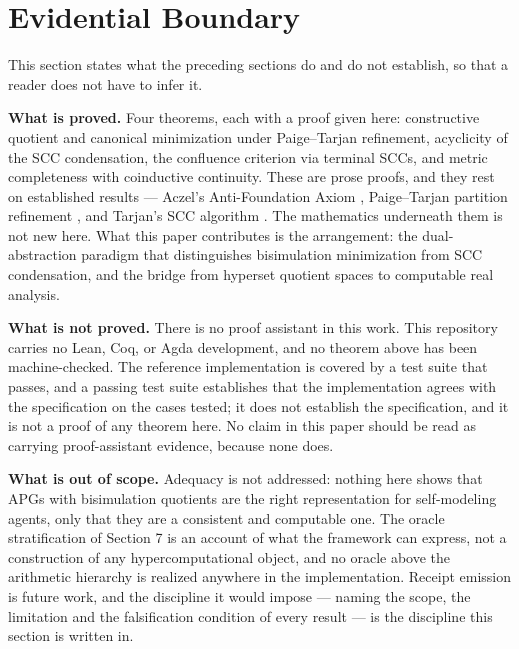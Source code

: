 \documentclass[11pt]{article}
\theoremstyle{definition}
\begin{document}
\section{Evidential Boundary}
This section states what the preceding sections do and do not establish, so that a reader does not have to infer it.

\noindent\textbf{What is proved.} Four theorems, each with a proof given here: constructive quotient and canonical minimization under Paige--Tarjan refinement, acyclicity of the SCC condensation, the confluence criterion via terminal SCCs, and metric completeness with coinductive continuity. These are prose proofs, and they rest on established results --- Aczel's Anti-Foundation Axiom \cite{aczel}, Paige--Tarjan partition refinement \cite{paige_tarjan}, and Tarjan's SCC algorithm \cite{tarjan}. The mathematics underneath them is not new here. What this paper contributes is the arrangement: the dual-abstraction paradigm that distinguishes bisimulation minimization from SCC condensation, and the bridge from hyperset quotient spaces to computable real analysis.

\noindent\textbf{What is not proved.} There is no proof assistant in this work. This repository carries no Lean, Coq, or Agda development, and no theorem above has been machine-checked. The reference implementation is covered by a test suite that passes, and a passing test suite establishes that the implementation agrees with the specification on the cases tested; it does not establish the specification, and it is not a proof of any theorem here. No claim in this paper should be read as carrying proof-assistant evidence, because none does.

\noindent\textbf{What is out of scope.} Adequacy is not addressed: nothing here shows that APGs with bisimulation quotients are the right representation for self-modeling agents, only that they are a consistent and computable one. The oracle stratification of Section 7 is an account of what the framework can express, not a construction of any hypercomputational object, and no oracle above the arithmetic hierarchy is realized anywhere in the implementation. Receipt emission is future work, and the discipline it would impose --- naming the scope, the limitation and the falsification condition of every result --- is the discipline this section is written in.
\end{document}
